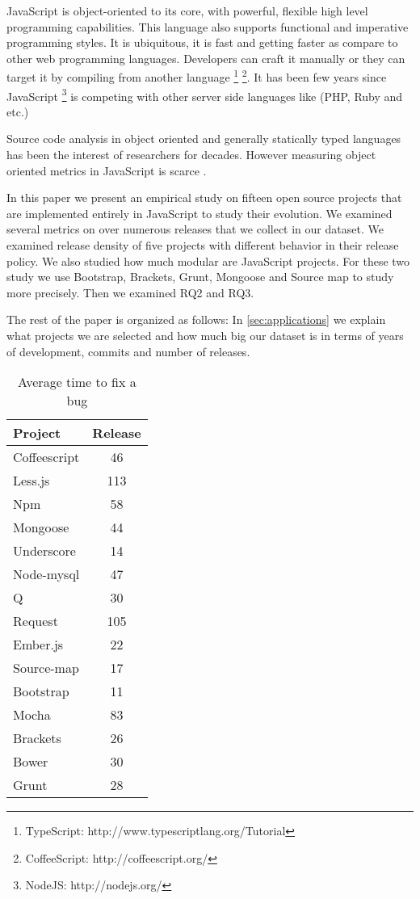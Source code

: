 
JavaScript is object-oriented to its core, with powerful, flexible high level programming capabilities. This language also supports functional and imperative programming styles. It is ubiquitous, it is fast and getting faster as compare to other web programming languages. Developers can craft it manually or they can target it by compiling from another language \footnote{TypeScript: http://www.typescriptlang.org/Tutorial} \footnote{CoffeeScript: http://coffeescript.org/}. It has been few years since JavaScript \footnote{NodeJS: http://nodejs.org/} is competing with other server side languages like (PHP, Ruby and etc.)

Source code analysis in object oriented and generally statically typed languages has been the interest of researchers for decades. However measuring object oriented metrics in JavaScript is scarce \cite{Richards:2010:ADB:1809028.1806598} \cite{6320536}.


In this paper we present an empirical study on fifteen open source projects that are implemented entirely in JavaScript to study their evolution. We examined several metrics on over numerous releases that we collect in our dataset. We examined release density of five projects with different behavior in their release policy. We also studied how much modular are JavaScript projects. For these two study we use Bootstrap, Brackets, Grunt, Mongoose and Source map to study more precisely.
 Then we examined RQ2 and RQ3.

The rest of the paper is organized as follows: In \ref{sec:applications} we explain what projects we are selected and how much big our dataset is in terms of years of development, commits and number of releases.


\begin{table}[!hbt]
	\begin{center}
		\caption{Average time to fix a bug}
		\label{tab:average_time_bugfix}
		\begin{tabular}{l| c }
			\toprule
			\textbf{Project}  & \textbf{Release} \\ \midrule              
			Coffeescript    & 46  \\
			Less.js         & 113 \\
			Npm             & 58  \\
			Mongoose        & 44  \\
			Underscore      & 14  \\
			Node-mysql      & 47  \\
			Q               & 30  \\
			Request         & 105 \\
			Ember.js        & 22  \\
			Source-map      & 17  \\
			Bootstrap       & 11  \\
			Mocha           & 83  \\
			Brackets        & 26  \\
			Bower           & 30  \\
			Grunt           & 28  \\  \bottomrule
		\end{tabular}
	\end{center}
\end{table}